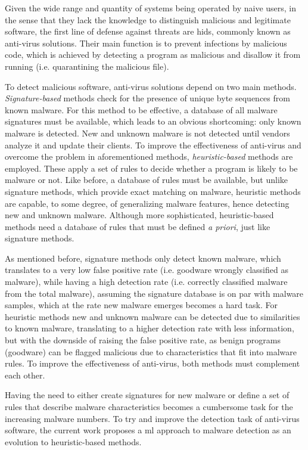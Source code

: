 \documentclass{llncs}
\begin{document}
Given the wide range and quantity of systems being operated by naive users, in the sense that they lack the knowledge to distinguish malicious and legitimate software, the first line of defense against threats are \gls{hids}, commonly known as anti-virus solutions. Their main function is to prevent infections by malicious code, which is achieved by detecting a program as malicious and disallow it from running (i.e. quarantining the malicious file).

To detect malicious software, anti-virus solutions depend on two main methods. \textit{Signature-based} methods check for the presence of unique byte sequences from known malware. For this method to be effective, a database of all malware signatures must be available, which leads to an obvious shortcoming: only known malware is detected\cite{gryaznov:scanners}. New and unknown malware is not detected until vendors analyze it and update their clients. To improve the effectiveness of anti-virus and overcome the problem in aforementioned methods, \textit{heuristic-based} methods are employed. These apply a set of rules to decide whether a program is likely to be malware or not. Like before, a database of rules must be available, but unlike signature methods, which provide exact matching on malware, heuristic methods are capable, to some degree, of generalizing malware features, hence detecting new and unknown malware. Although more sophisticated, heuristic-based methods need a database of rules that must be defined \textit{a priori}, just like signature methods.

As mentioned before, signature methods only detect known malware, which translates to a very low false positive rate (i.e. goodware wrongly classified as malware), while having a high detection rate (i.e. correctly classified malware from the total malware), assuming the signature database is on par with malware samples, which at the rate new malware emerges becomes a hard task. For heuristic methods new and unknown malware can be detected due to similarities to known malware, translating to a higher detection rate with less information, but with the downside of raising the false positive rate, as benign programs (goodware) can be flagged malicious due to characteristics that fit into malware rules\cite{gryaznov:scanners}. To improve the effectiveness of anti-virus, both methods must complement each other.

Having the need to either create signatures for new malware or define a set of rules that describe malware characteristics becomes a cumbersome task for the increasing malware numbers. To try and improve the detection task of anti-virus software, the current work proposes a \gls{ml} approach to malware detection as an evolution to heuristic-based methods.
\end{document}
